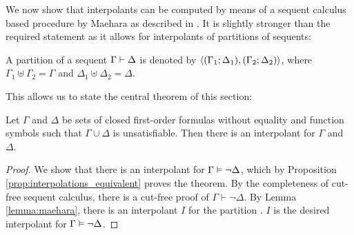 \begin{comment}
	Suppose $\pi$ contains an instance of \lkrule{w}{r} such that the equality symbolc occurs in the principal formula $A$. 
	Then as it does not occur in the end sequent, it is removed by either an instance of an equality rule or the cut rule. 
	Suppose it is removed via an equality rule. We consider the case of  $\lkrule{=}{l_1}$.
	\begin{prooftree}

		\AxiomCm{\Lambda, A\occurat{t}{p} \proves \Theta}

		\AxiomCm{\varphi}
		\noLine
		\UnaryInfCm{\Gamma \proves \Delta}
		\RightLabelm{\lkrule{w}{r}}
		\UnaryInfCm{\Gamma \proves \Delta, s=t}
		\noLine
		\UnaryInfCm{\vdots}
		\noLine
		\UnaryInfCm{\Sigma \proves \Pi, s=t}

		\RightLabelm{\lkrule{=}{l_1}}                        
		\BinaryInfm{\Lambda, \Sigma, A\occurat{s}{p} \fCenter \Theta, \Pi }
	\end{prooftree}



	TODO


	(proof might become longer, but how does that work? don't innessential cuts remain?)

\end{proof}
\end{comment}


We now show that interpolants can be computed by means of a sequent calculus based procedure by Maehara as described in \cite[Lemma\ 6.5]{takeuti87}.
It is slightly stronger than the required statement as it allows for interpolants of partitions of sequents:

\begin{defi}
	A {partition} of a sequent $\Gamma \vdash \Delta$ is denoted by $ \langle (\Gamma_1; \Delta_1), (\Gamma_2; \Delta_2)\rangle $, where
	$\Gamma_1 \uplus \Gamma_2 = \Gamma$ and 
	$\Delta_1 \uplus \Delta_2 = \Delta$.
\end{defi}



This allows us to state the central theorem of this section:
\begin{thm}
	\label{thm:prop_interpol}
	Let $\Gamma$ and $\Delta$ be sets of closed first-order formulas without equality and function symbols such that $\Gamma \cup \Delta$ is unsatisfiable. Then there is an interpolant for $\Gamma$ and~$\Delta$.
\end{thm}
\begin{proof}
	We show that there is an interpolant for $\Gamma \vDash \lnot \Delta$, which
	by Proposition \ref{prop:interpolations_equivalent} proves the theorem.
	By the completeness of cut-free sequent calculus, there is a cut-free proof of $\Gamma \vdash \lnot \Delta$.
	By Lemma \ref{lemma:maehara}, there is an interpolant $I$ for the partition \parti{\Gamma}{}{}{\lnot \Delta}.
	$I$ is the desired interpolant for $\Gamma\vDash\lnot\Delta$.

\end{proof}



